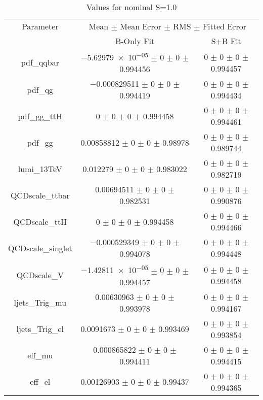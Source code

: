 \begin{table}
\centering
\caption{Values for nominal S=1.0}
\begin{tabular}{ccc}
\toprule
Parameter & \multicolumn{2}{c}{Mean $\pm$ Mean Error $\pm$ RMS $\pm$ Fitted Error}\\
 & B-Only Fit & S+B Fit\\
\midrule
pdf\_qqbar & \num{-5.62979e-05} $\pm$ \num{0} $\pm$ \num{0} $\pm$ \num{0.994456} & \num{0} $\pm$ \num{0} $\pm$ \num{0} $\pm$ \num{0.994457}\\
pdf\_qg & \num{-0.000829511} $\pm$ \num{0} $\pm$ \num{0} $\pm$ \num{0.994419} & \num{0} $\pm$ \num{0} $\pm$ \num{0} $\pm$ \num{0.994434}\\
pdf\_gg\_ttH & \num{0} $\pm$ \num{0} $\pm$ \num{0} $\pm$ \num{0.994458} & \num{0} $\pm$ \num{0} $\pm$ \num{0} $\pm$ \num{0.994461}\\
pdf\_gg & \num{0.00858812} $\pm$ \num{0} $\pm$ \num{0} $\pm$ \num{0.98978} & \num{0} $\pm$ \num{0} $\pm$ \num{0} $\pm$ \num{0.989744}\\
lumi\_13TeV & \num{0.012279} $\pm$ \num{0} $\pm$ \num{0} $\pm$ \num{0.983022} & \num{0} $\pm$ \num{0} $\pm$ \num{0} $\pm$ \num{0.982719}\\
QCDscale\_ttbar & \num{0.00694511} $\pm$ \num{0} $\pm$ \num{0} $\pm$ \num{0.982531} & \num{0} $\pm$ \num{0} $\pm$ \num{0} $\pm$ \num{0.990876}\\
QCDscale\_ttH & \num{0} $\pm$ \num{0} $\pm$ \num{0} $\pm$ \num{0.994458} & \num{0} $\pm$ \num{0} $\pm$ \num{0} $\pm$ \num{0.994466}\\
QCDscale\_singlet & \num{-0.000529349} $\pm$ \num{0} $\pm$ \num{0} $\pm$ \num{0.994078} & \num{0} $\pm$ \num{0} $\pm$ \num{0} $\pm$ \num{0.994448}\\
QCDscale\_V & \num{-1.42811e-05} $\pm$ \num{0} $\pm$ \num{0} $\pm$ \num{0.994457} & \num{0} $\pm$ \num{0} $\pm$ \num{0} $\pm$ \num{0.994458}\\
ljets\_Trig\_mu & \num{0.00630963} $\pm$ \num{0} $\pm$ \num{0} $\pm$ \num{0.993978} & \num{0} $\pm$ \num{0} $\pm$ \num{0} $\pm$ \num{0.994167}\\
ljets\_Trig\_el & \num{0.0091673} $\pm$ \num{0} $\pm$ \num{0} $\pm$ \num{0.993469} & \num{0} $\pm$ \num{0} $\pm$ \num{0} $\pm$ \num{0.993854}\\
eff\_mu & \num{0.000865822} $\pm$ \num{0} $\pm$ \num{0} $\pm$ \num{0.994411} & \num{0} $\pm$ \num{0} $\pm$ \num{0} $\pm$ \num{0.994415}\\
eff\_el & \num{0.00126903} $\pm$ \num{0} $\pm$ \num{0} $\pm$ \num{0.99437} & \num{0} $\pm$ \num{0} $\pm$ \num{0} $\pm$ \num{0.994365}\\

\end{tabular}
\end{table}
